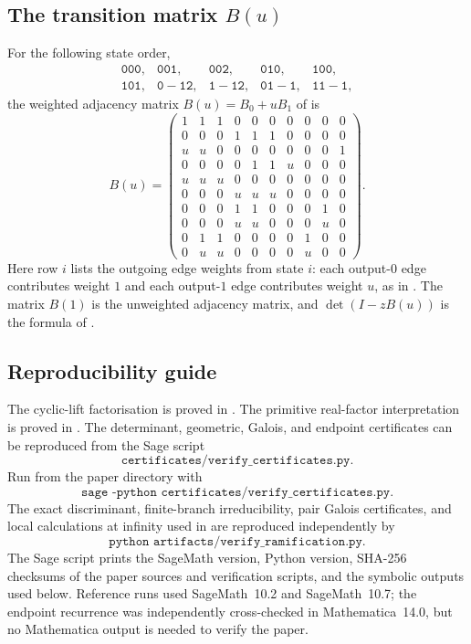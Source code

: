 \subsection*{The transition matrix \texorpdfstring{\(B(u)\)}{B(u)}}


For the following state order,
\[
\begin{array}{ccccc}
\mathtt{000},&\mathtt{001},&\mathtt{002},&\mathtt{010},&\mathtt{100},\\
\mathtt{101},&\mathtt{0{-}12},&\mathtt{1{-}12},&
\mathtt{01{-}1},&\mathtt{11{-}1},
\end{array}
\]
the weighted adjacency matrix \(B(u)=B_0+uB_1\) of
 is
\[
B(u)=
\begin{pmatrix}
1 & 1 & 1 & 0 & 0 & 0 & 0 & 0 & 0 & 0 \\
0 & 0 & 0 & 1 & 1 & 1 & 0 & 0 & 0 & 0 \\
u & u & 0 & 0 & 0 & 0 & 0 & 0 & 0 & 1 \\
0 & 0 & 0 & 0 & 1 & 1 & u & 0 & 0 & 0 \\
u & u & u & 0 & 0 & 0 & 0 & 0 & 0 & 0 \\
0 & 0 & 0 & u & u & u & 0 & 0 & 0 & 0 \\
0 & 0 & 0 & 1 & 1 & 0 & 0 & 0 & 1 & 0 \\
0 & 0 & 0 & u & u & 0 & 0 & 0 & u & 0 \\
0 & 1 & 1 & 0 & 0 & 0 & 0 & 1 & 0 & 0 \\
0 & u & u & 0 & 0 & 0 & 0 & u & 0 & 0
\end{pmatrix}.
\]
Here row \(i\) lists the outgoing edge weights from state \(i\): each
output-\(0\) edge contributes weight \(1\) and each output-\(1\) edge
contributes weight \(u\), as in . The matrix \(B(1)\)
is the unweighted adjacency matrix, and \(\det(I-zB(u))\) is the formula
of .


\subsection*{Reproducibility guide}


The cyclic-lift factorisation is proved in
. The primitive real-factor
interpretation is proved in .
The determinant, geometric, Galois, and endpoint certificates can be
reproduced from the Sage script
\[
  \texttt{certificates/verify\_certificates.py}.
\]
Run from the paper directory with
\[
  \texttt{sage -python certificates/verify\_certificates.py}.
\]
The exact discriminant, finite-branch irreducibility, pair Galois
certificates, and local calculations at infinity used in
 are reproduced independently by
\[
  \texttt{python artifacts/verify\_ramification.py}.
\]
The Sage script prints the SageMath version, Python version, SHA-256
checksums of the paper sources and verification scripts, and the symbolic
outputs used below. Reference runs used SageMath~10.2 and SageMath~10.7;
the endpoint recurrence was independently cross-checked in
Mathematica~14.0, but no Mathematica output is needed to verify the
paper.

